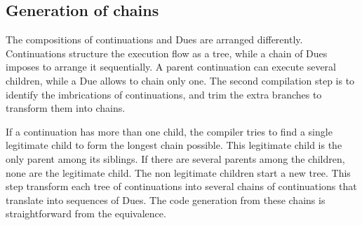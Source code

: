 
\subsection{Generation of chains}

The compositions of continuations and Dues are arranged differently.
Continuations structure the execution flow as a tree, while a chain of Dues imposes to arrange it sequentially.
A parent continuation can execute several children, while a Due allows to chain only one.
The second compilation step is to identify the imbrications of continuations, and trim the extra branches to transform them into chains.

If a continuation has more than one child, the compiler tries to find a single legitimate child to form the longest chain possible.
This legitimate child is the only parent among its siblings.
If there are several parents among the children, none are the legitimate child.
The non legitimate children start a new tree.
This step transform each tree of continuations into several chains of continuations that translate into sequences of Dues.
The code generation from these chains is straightforward from the equivalence.







